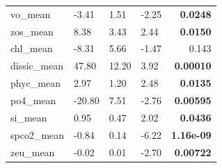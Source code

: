 \documentclass[a4paper,fleqn]{cas-sc}
\begin{document}
\begin{table}[width=\linewidth,cols=5,pos=!htbp]
\begin{tabular*}{\tblwidth}{@{} LLLL R @{}}
vo\_mean       & -3.41     & 1.51      & -2.25 & \textbf{0.0248} \\
zos\_mean      & 8.38      & 3.43      & 2.44  & \textbf{0.0150} \\
chl\_mean      & -8.31     & 5.66      & -1.47 & 0.143 \\
dissic\_mean   & 47.80     & 12.20     & 3.92  & \textbf{0.00010} \\
phyc\_mean     & 2.97      & 1.20      & 2.48  & \textbf{0.0135} \\
po4\_mean      & -20.80    & 7.51      & -2.76 & \textbf{0.00595} \\
si\_mean       & 0.95      & 0.47      & 2.02  & \textbf{0.0436} \\
spco2\_mean    & -0.84     & 0.14      & -6.22 & \textbf{1.16e-09} \\
zeu\_mean      & -0.02     & 0.01      & -2.70 & \textbf{0.00722} \\
\bottomrule
\end{tabular*}
\label{tab:5}
\end{table}
\end{document}
